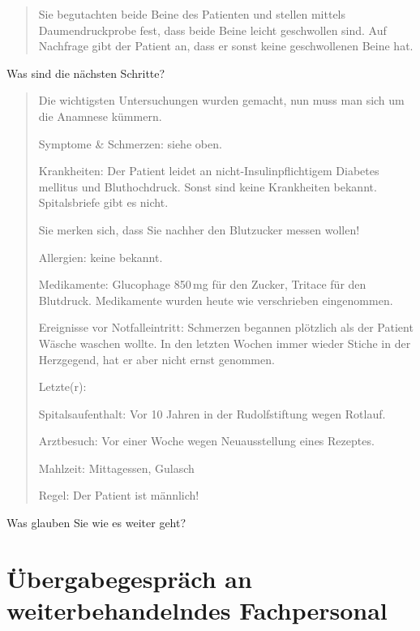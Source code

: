\begin{quote}
  Sie begutachten beide Beine des Patienten und stellen mittels
  Daumendruckprobe fest, dass beide Beine leicht geschwollen sind. Auf
  Nachfrage gibt der Patient an, dass er sonst keine geschwollenen Beine
  hat.
\end{quote}

Was sind die nächsten Schritte?

\begin{quote}
  Die wichtigsten Untersuchungen wurden gemacht, nun muss man sich um die
  Anamnese kümmern.
  
  Symptome \& Schmerzen: siehe oben.
  
  Krankheiten: Der Patient leidet an nicht-Insulinpflichtigem Diabetes
  mellitus und Bluthochdruck. Sonst sind keine Krankheiten bekannt.
  Spitalsbriefe gibt es nicht.
  
  Sie merken sich, dass Sie nachher den Blutzucker messen wollen!
  
  Allergien: keine bekannt.
  
  Medikamente: Glucophage 850\,mg für den Zucker, Tritace für den
  Blutdruck. Medikamente wurden heute wie verschrieben eingenommen.
  
  Ereignisse vor Notfalleintritt: Schmerzen begannen plötzlich als der
  Patient Wäsche waschen wollte. In den letzten Wochen immer wieder
  Stiche in der Herzgegend, hat er aber nicht ernst genommen.
  
  Letzte(r):
  
  Spitalsaufenthalt: Vor 10 Jahren in der Rudolfstiftung wegen Rotlauf.
  
  Arztbesuch: Vor einer Woche wegen Neuausstellung eines Rezeptes.
  
  Mahlzeit: Mittagessen, Gulasch
  
  Regel: Der Patient ist männlich!
\end{quote}
% 

Was glauben Sie wie es weiter geht?

\TakeNotesLarge


\section{Übergabegespräch an weiterbehandelndes Fachpersonal}  

